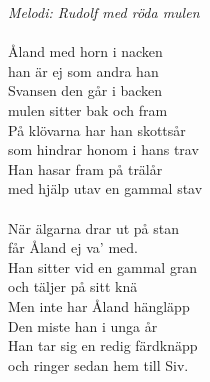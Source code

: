 {\footnotesize\textit{Melodi: Rudolf med röda mulen}} \\
\\
Åland med horn i nacken\\
han är ej som andra han\\
Svansen den går i backen\\
mulen sitter bak och fram\\
På klövarna har han skottsår\\
som hindrar honom i hans trav\\
Han hasar fram på trälår\\
med hjälp utav en gammal stav\\
\\
När älgarna drar ut på stan\\
får Åland ej va' med.\\
Han sitter vid en gammal gran\\
och täljer på sitt knä\\
Men inte har Åland hängläpp\\
Den miste han i unga år\\
Han tar sig en redig färdknäpp\\
och ringer sedan hem till Siv.
